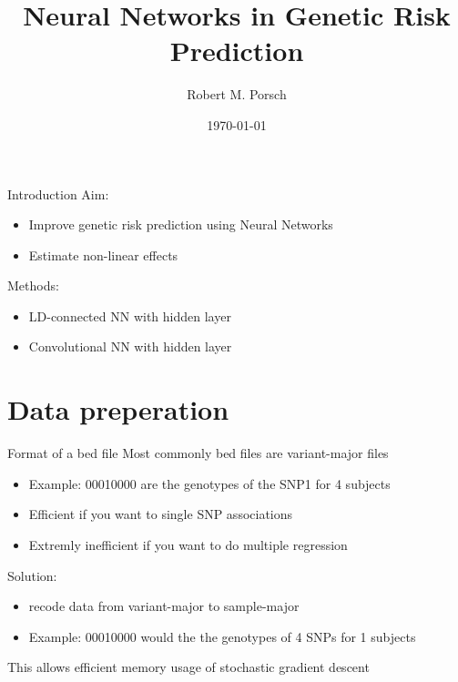 \documentclass{beamer}
\title{Neural Networks in Genetic Risk Prediction}
\date{\today}
\author{Robert M. Porsch}
\institute{Center of Genomic Science}
\begin{document}
\maketitle

\begin{frame}[t]{Introduction}
  Aim:
  \begin{itemize}
    \item Improve genetic risk prediction using Neural Networks
    \item Estimate non-linear effects
  \end{itemize}
  Methods:
  \begin{itemize}
    \item LD-connected NN with hidden layer
    \item Convolutional NN with hidden layer
  \end{itemize}
\end{frame}

\section{Data preperation}

\begin{frame}[t]{Format of a bed file}
  Most commonly bed files are variant-major files
  \begin{itemize}
    \item Example: 00010000 are the genotypes of the SNP1 for 4 subjects
    \item Efficient if you want to single SNP associations
    \item Extremly inefficient if you want to do multiple regression
  \end{itemize}
  Solution:
  \begin{itemize}
    \item recode data from variant-major to sample-major
    \item Example: 00010000 would the the genotypes of 4 SNPs for 1 subjects
  \end{itemize}
  This allows efficient memory usage of stochastic gradient descent
\end{frame}
\end{document}
